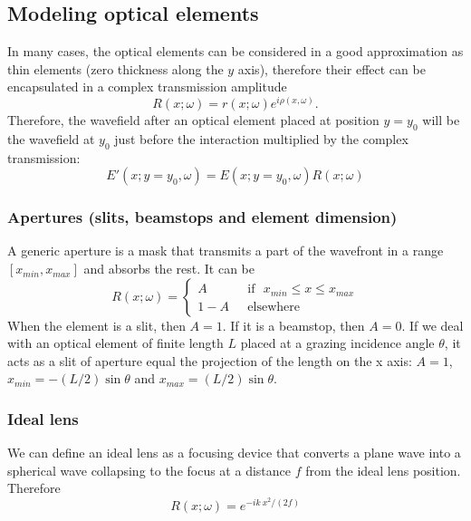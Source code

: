\documentclass[]{spie}  %
\begin{document}
\subsection{Modeling optical elements}
\label{sec:elements}

In many cases, the optical elements can be considered in a good approximation as thin elements (zero thickness along the $y$ axis), therefore their effect can be encapsulated in a complex transmission amplitude 
\begin{equation}
    \label{eq:thinelement}
    R(x;\omega)=r(x;\omega) e^{i \rho(x,\omega)}.
\end{equation}
Therefore, the wavefield after an optical element placed at position $y=y_0$ will be the wavefield at $y_0$ just before the interaction multiplied by the complex transmission:
\begin{equation}
    E'(x;y=y_0,\omega) = E(x;y=y_0,\omega) R(x;\omega)
\end{equation}


\subsubsection{Apertures (slits, beamstops and element dimension)}
\label{sec:aperture}

A generic aperture is a mask that transmits a part of the wavefront in a range $[x_{min},x_{max}]$ and absorbs the rest. It can be
\begin{equation}
R(x;\omega) =
\left\{
\begin{matrix}
A  & \mbox{~~if~~} x_{min} \le x \le x_{max}
\\ 
1 - A & \mbox{~~elsewhere}
\end{matrix}
\right.
\end{equation}
When the element is a slit, then $A=1$. If it is a beamstop, then $A=0$. If we deal with an optical element of finite length $L$ placed at a grazing incidence angle $\theta$, it acts as a slit of aperture equal the projection of the length on the x axis: $A=1$, $x_{min}=-(L/2) \sin \theta$ and $x_{max}=(L/2) \sin \theta$. 

\subsubsection{Ideal lens}
\label{sec:idealLens}
We can define an ideal lens as a focusing device that converts a plane wave into a spherical wave collapsing to the focus at a distance $f$ from the ideal lens position. Therefore
\begin{equation}
    R(x;\omega) = e^{-i k~x^2/(2 f)}
\end{equation}
\end{document}

